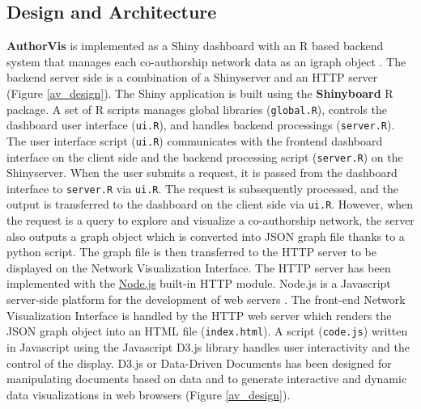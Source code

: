\subsection{Design and Architecture}
\textbf{AuthorVis} is implemented as a Shiny dashboard with an R based backend system that manages each co-authorship network data as an igraph object \cite{csardi_igraph_2006}. The backend server side is a combination of a Shinyserver and an HTTP server (Figure \ref{av_design}). The Shiny application is built using the \textbf{Shinyboard} \cite{chang_shiny:_2017,chang_shinydashboard:_2015} R package. A set of R scripts manages global libraries (\texttt{global.R}), controls the dashboard user interface (\texttt{ui.R}), and handles backend processings (\texttt{server.R}). The user interface script (\texttt{ui.R}) communicates with the frontend dashboard interface on the client side and the backend processing script (\texttt{server.R}) on the Shinyserver. When the user submits a request, it is passed from the dashboard interface to \texttt{server.R} via \texttt{ui.R}. The request is subsequently processed, and the output is transferred to the dashboard on the client side via \texttt{ui.R}. However, when the request is a query to explore and visualize a co-authorship network, the server also outputs a graph object which is converted into JSON graph file thanks to a python script. The graph file is then transferred to the HTTP server to be displayed on the Network Visualization Interface. The HTTP server has been implemented with the \href{https://nodejs.org}{Node.js} built-in HTTP module. Node.js is a Javascript server-side platform for the development of web servers \cite{WilsonNodejsRight2018}. The front-end Network Visualization Interface is handled by the HTTP web server which renders the JSON graph object into an HTML file (\texttt{index.html}). A script (\texttt{code.js}) written in Javascript using the Javascript D3.js \cite{bostock_d3._2012} library handles user interactivity and the control of the display. D3.js or Data-Driven Documents has been designed for manipulating documents based on data and to generate interactive and dynamic data visualizations in web browsers (Figure \ref{av_design}).
